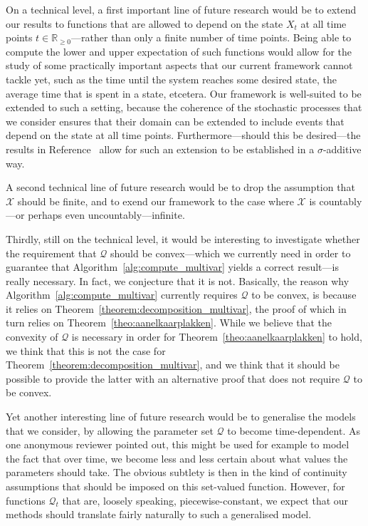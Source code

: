 \documentclass[10pt,a4paper]{paper}
\theoremstyle{definition}
\newcommand{\reals}{\mathbb{R}}
\newcommand{\realsnonneg}{\reals_{\geq 0}}
\newcommand{\states}{\mathcal{X}}
\newcommand{\rateset}{\mathcal{Q}}
\begin{document}
On a technical level, a first important line of future research would be to extend our results to functions that are allowed to depend on the state $X_t$ at all time points $t\in\realsnonneg$---rather than only a finite number of time points. Being able to compute the lower and upper expectation of such functions would allow for the study of some practically important aspects that our current framework cannot tackle yet, such as the time until the system reaches some desired state, the average time that is spent in a state, etcetera. 
Our framework is well-suited to be extended to such a setting, because the coherence of the stochastic processes that we consider ensures that their domain can be extended to include events that depend on the state at all time points. Furthermore---should this be desired---the results in Reference~\cite{berti2002coherent} allow for such an extension to be established in a $\sigma$-additive way. 

A second technical line of future research would be to drop the assumption that $\states$ should be finite, and to exend our framework to the case where $\states$ is countably---or perhaps even uncountably---infinite.

Thirdly, still on the technical level, it would be interesting to investigate whether the requirement that $\rateset$ should be convex---which we currently need in order to guarantee that Algorithm~\ref{alg:compute_multivar} yields a correct result---is really necessary. In fact, we conjecture that it is not. Basically, the reason why Algorithm~\ref{alg:compute_multivar} currently requires $\rateset$ to be convex, is because it relies on Theorem~\ref{theorem:decomposition_multivar}, the proof of which in turn relies on Theorem~\ref{theo:aanelkaarplakken}. While we believe that the convexity of $\rateset$ is necessary in order for Theorem~\ref{theo:aanelkaarplakken} to hold, we think that this is not the case for Theorem~\ref{theorem:decomposition_multivar}, and we think that it should be possible to provide the latter with an alternative proof that does not require $\rateset$ to be convex. 

Yet another interesting line of future research would be to generalise the models that we consider, by allowing the parameter set $\rateset$ to become time-dependent. As one anonymous reviewer pointed out, this might be used for example to model the fact that over time, we become less and less certain about what values the parameters should take. The obvious subtlety is then in the kind of continuity assumptions that should be imposed on this set-valued function. However, for functions $\rateset_t$ that are, loosely speaking, piecewise-constant, we expect that our methods should translate fairly naturally to such a generalised model.
\end{document}
